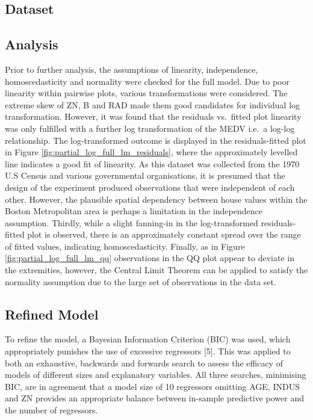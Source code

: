\documentclass[letterpaper,10pt,twocolumn,twoside,]{pinp}
\begin{document}
\hypertarget{dataset}{%
\subsection{Dataset}\label{dataset}}

\hypertarget{analysis}{%
\subsection{Analysis}\label{analysis}}

Prior to further analysis, the assumptions of linearity, independence,
homoscedasticity and normality were checked for the full model. Due to
poor linearity within pairwise plots, various transformations were
considered. The extreme skew of ZN, B and RAD made them good candidates
for individual log transformation. However, it was found that the
residuals vs.~fitted plot linearity was only fulfilled with a further
log transformation of the MEDV i.e.~a log-log relationship. The
log-transformed outcome is displayed in the residuals-fitted plot in
Figure \ref{fig:partial_log_full_lm_residuals}, where the approximately
levelled line indicates a good fit of linearity. As this dataset was
collected from the 1970 U.S Census and various governmental
organisations, it is presumed that the design of the experiment produced
observations that were independent of each other. However, the plausible
spatial dependency between house values within the Boston Metropolitan
area is perhaps a limitation in the independence assumption. Thirdly,
while a slight fanning-in in the log-transformed residuals-fitted plot
is observed, there is an approximately constant spread over the range of
fitted values, indicating homoscedasticity. Finally, as in Figure
\ref{fig:partial_log_full_lm_qq} observations in the QQ plot appear to
deviate in the extremities, however, the Central Limit Theorem can be
applied to satisfy the normality assumption due to the large set of
observations in the data set.

\hypertarget{refined-model}{%
\subsection{Refined Model}\label{refined-model}}

To refine the model, a Bayesian Information Criterion (BIC) was used,
which appropriately punishes the use of excessive regressors {[}5{]}.
This was applied to both an exhaustive, backwards and forwards search to
assess the efficacy of models of different sizes and explanatory
variables. All three searches, minimising BIC, are in agreement that a
model size of 10 regressors omitting AGE, INDUS and ZN provides an
appropriate balance between in-sample predictive power and the number of
regressors.
\end{document}
